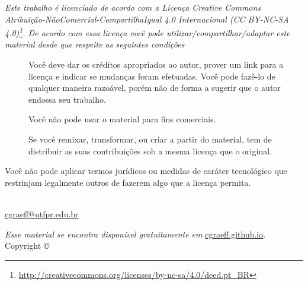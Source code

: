 \thispagestyle{empty}
\begin{center}
\Huge\ccbyncsa
\end{center}
{\it
Este trabalho é licenciado de acordo com a Licença Creative Commons  Atribuição-NãoComercial-CompartilhaIgual 4.0 Internacional  (CC BY-NC-SA 4.0)\footnote{\url{http://creativecommons.org/licenses/by-nc-sa/4.0/deed.pt_BR}}. De acordo com essa licença você pode utilizar/compartilhar/adaptar este material desde que respeite as seguintes condições
\begin{description}
	\item[\ccAttribution]Você deve dar os créditos apropriados ao autor, prover um link para a licença e indicar se mudanças foram efetuadas. Você pode fazê-lo de qualquer maneira razoável, porém não de forma a sugerir que o autor endossa seu trabalho.

    \item[\ccNonCommercial]Você não pode usar o material para fins comerciais.

    \item[\ccShareAlike]Se você remixar, transformar, ou criar a partir do material, tem de distribuir as suas contribuições sob a mesma licença que o original.
\end{description}
Você não pode aplicar termos jurídicos ou medidas de caráter tecnológico que restrinjam legalmente outros de fazerem algo que a licença permita.
}
%
\vfill
%
%
\begin{fullwidth}
\setlength{\parindent}{0pt}
\setlength{\parskip}{\baselineskip}
\thanklessauthor\\
\url{cgraeff@utfpr.edu.br}\\
\end{fullwidth}
%
\vspace{1cm}
%
\begin{fullwidth}
\par\emph{Esse material se encontra disponível gratuitamente em} \url{cgraeff.github.io}.\\
\noindent{}Copyright \copyright\ \the\year\ \thanklessauthor
\end{fullwidth}
